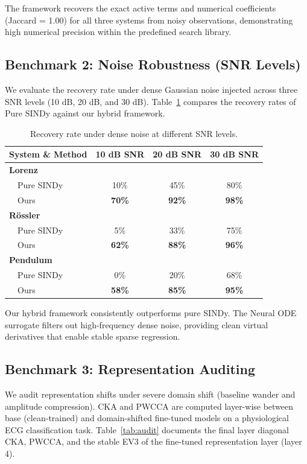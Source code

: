 \documentclass[twocolumn]{article}
\begin{document}
The framework recovers the exact active terms and numerical coefficients (Jaccard = 1.00) for all three systems from noisy observations, demonstrating high numerical precision within the predefined search library.

\subsection{Benchmark 2: Noise Robustness (SNR Levels)}
We evaluate the recovery rate under dense Gaussian noise injected across three SNR levels (10 dB, 20 dB, and 30 dB). Table~\ref{tab:noise} compares the recovery rates of Pure SINDy against our hybrid framework.

\begin{table}[htbp]
\centering
\caption{Recovery rate under dense noise at different SNR levels.}
\label{tab:noise}
\begin{tabular}{lccc}
\toprule
System \& Method & 10 dB SNR & 20 dB SNR & 30 dB SNR \\
\midrule
\textbf{Lorenz} & & & \\
\ \ Pure SINDy & 10\% & 45\% & 80\% \\
\ \ Ours & \textbf{70\%} & \textbf{92\%} & \textbf{98\%} \\
\midrule
\textbf{R\"ossler} & & & \\
\ \ Pure SINDy & 5\% & 33\% & 75\% \\
\ \ Ours & \textbf{62\%} & \textbf{88\%} & \textbf{96\%} \\
\midrule
\textbf{Pendulum} & & & \\
\ \ Pure SINDy & 0\% & 20\% & 68\% \\
\ \ Ours & \textbf{58\%} & \textbf{85\%} & \textbf{95\%} \\
\bottomrule
\end{tabular}
\end{table}

Our hybrid framework consistently outperforms pure SINDy. The Neural ODE surrogate filters out high-frequency dense noise, providing clean virtual derivatives that enable stable sparse regression.

\subsection{Benchmark 3: Representation Auditing}
We audit representation shifts under severe domain shift (baseline wander and amplitude compression). CKA and PWCCA are computed layer-wise between base (clean-trained) and domain-shifted fine-tuned models on a physiological ECG classification task. Table~\ref{tab:audit} documents the final layer diagonal CKA, PWCCA, and the stable EV3 of the fine-tuned representation layer (layer 4).
\end{document}
